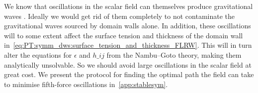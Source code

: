    We know that oscillations in the scalar field can themselves produce gravitational waves  \citep{kawasakiStudyGravitationalRadiation2011}. Ideally we would get rid of them completely to not contaminate the gravitational waves sourced by domain walls alone. %
    In addition, these oscillations will to some extent affect the surface tension and thickness of the domain wall in~\cref{eq:PT:symm_dws:surface_tension_and_thickness_FLRW}. This will in turn alter the equations for $\epsilon$ and $h\_{ij}$ from the Nambu--Goto theory, making them analytically unsolvable. So we should avoid large oscillations in the scalar field at great cost. %
    We present the protocol for finding the optimal path the field can take to minimise fifth-force oscillations in~\cref{app:stablesym}. %



    
    








